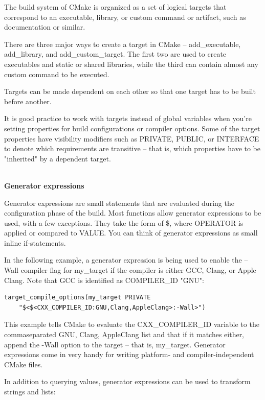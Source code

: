 The build system of CMake is organized as a set of logical targets that correspond to an executable, library, or custom command or artifact, such as documentation or similar.

There are three major ways to create a target in CMake – add\_executable, add\_library, and add\_custom\_target. The first two are used to create executables and static or shared libraries, while the third can contain almost any custom command to be executed.

Targets can be made dependent on each other so that one target has to be built
before another.

It is good practice to work with targets instead of global variables when you're setting properties for build configurations or compiler options. Some of the target properties have visibility modifiers such as PRIVATE, PUBLIC, or INTERFACE to denote which requirements are transitive – that is, which properties have to be "inherited" by a dependent target.


\hspace*{\fill} \\ %
\noindent
\textbf{Generator expressions}

Generator expressions are small statements that are evaluated during the configuration phase of the build. Most functions allow generator expressions to be used, with a few exceptions. They take the form of \$<OPERATOR:VALUE>, where OPERATOR is applied or compared to VALUE. You can think of generator expressions as small inline if-statements.

In the following example, a generator expression is being used to enable the –Wall compiler flag for my\_target if the compiler is either GCC, Clang, or Apple Clang. Note that GCC is identified as COMPILER\_ID "GNU":

\begin{lstlisting}[style=styleCMake]
target_compile_options(my_target PRIVATE
	"$<$<CXX_COMPILER_ID:GNU,Clang,AppleClang>:-Wall>")
\end{lstlisting}

This example tells CMake to evaluate the CXX\_COMPILER\_ID variable to the commaseparated GNU, Clang, AppleClang list and that if it matches either, append the -Wall option to the target – that is, my\_target. Generator expressions come in very handy for writing platform- and compiler-independent CMake files. 

In addition to querying values, generator expressions can be used to transform strings and lists:

